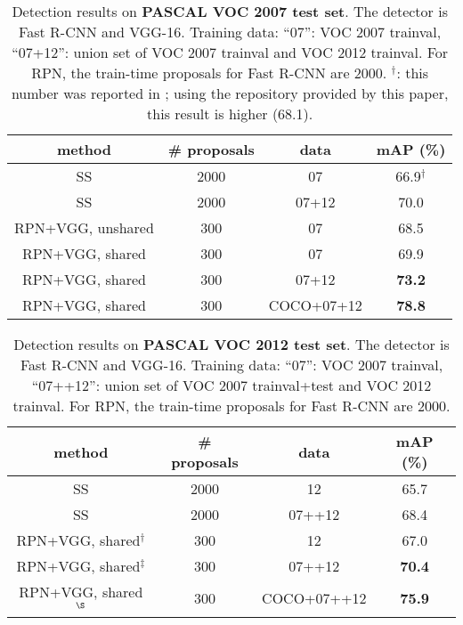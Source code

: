 \documentclass[10pt,journal,cspaper,compsoc]{IEEEtran}
\begin{document}
\setlength{\tabcolsep}{10pt}
\renewcommand{\arraystretch}{1.1}
\begin{table*}[t]
\begin{center}
\caption{Detection results on \textbf{PASCAL VOC 2007 test set}. The detector is Fast R-CNN and VGG-16. Training data: ``07'': VOC 2007 trainval, ``07+12'': union set of VOC 2007 trainval and VOC 2012 trainval. For RPN, the train-time proposals for Fast R-CNN are 2000. $^\dag$: this number was reported in \cite{Girshick2015a}; using the repository provided by this paper, this result is higher (68.1).}
\vspace{-1em}
\small
\begin{tabular}{cc|c|c}
  method & \# proposals & data & mAP (\%) \\
  \hline\hline
  SS & 2000 & 07 & 66.9$^\dag$ \\
  SS & 2000 & 07+12 & 70.0 \\
  \hline
  RPN+VGG, unshared & 300 & 07 & 68.5 \\
  RPN+VGG, shared & 300 & 07 & 69.9 \\
  RPN+VGG, shared & 300 & 07+12 & \textbf{73.2} \\
  \hline
  RPN+VGG, shared & 300 & COCO+07+12 & \textbf{78.8} \\
\end{tabular}
\label{tab:vgg}
\end{center}
\end{table*}

\begin{table*}[t]
\begin{center}
\caption{Detection results on \textbf{PASCAL VOC 2012 test set}. The detector is Fast R-CNN and VGG-16. Training data: ``07'': VOC 2007 trainval, ``07++12'': union set of VOC 2007 trainval+test and VOC 2012 trainval. For RPN, the train-time proposals for Fast R-CNN are 2000. \fontsize{8pt}{1em}}
\vspace{-1em}
\small
\begin{tabular}{cc|c|c}
  method & \# proposals & data & mAP (\%) \\
  \hline\hline
  SS & 2000 & 12 & 65.7 \\
  SS & 2000 & 07++12 & 68.4 \\
  \hline
  RPN+VGG, shared$^\dag$ & 300 & 12 & 67.0 \\
  RPN+VGG, shared$^\ddag$ & 300 & 07++12 & \textbf{70.4} \\
  \hline
  RPN+VGG, shared$^\S$ & 300 & COCO+07++12 & \textbf{75.9} \\
\end{tabular}
\label{tab:vgg12}
\end{center}
\end{table*}
\end{document}
